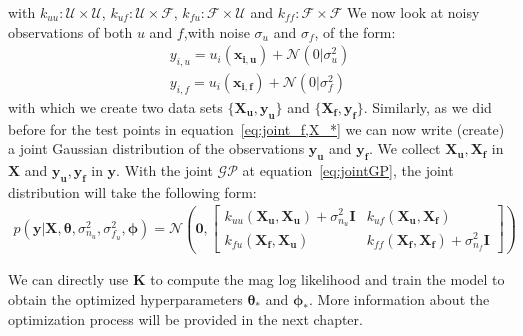 \documentclass{article}
\begin{document}
with $k_{uu}: \mathcal{U} \times  \mathcal{U}$, $k_{uf}: \mathcal{U} \times  \mathcal{F}$, $k_{fu}: \mathcal{F} \times  \mathcal{U}$ and $k_{ff}: \mathcal{F} \times  \mathcal{F}$
We now look at noisy observations of both $u$ and $f$,with noise $\sigma_u$ and $\sigma_f$, of the form:
\begin{equation}
    \begin{aligned}
        y_{i,u} = u_i(\bm{x_{i,u}}) + \mathcal{N}(0|\sigma_u^2) \\
        y_{i,f} = u_i(\bm{x_{i,f}}) + \mathcal{N}(0|\sigma_f^2)
    \end{aligned}
\end{equation}
with which we create two data sets $\{\bm{X_u,y_u}\}$ and $\{\bm{X_f,y_f}\}$. Similarly, as we did before for the test points in equation~\ref{eq:joint_f,X_*} we can now write (create) a joint Gaussian distribution of the observations $\bm{y_u}$ and $\bm{y_f}$. We collect $\bm{X_u,X_f}$ in $\bm{X}$ and $\bm{y_u,y_f}$ in $\bm{y}$. With the joint $\mathcal{GP}$ at equation~\ref{eq:jointGP}, the joint distribution will take the following form:
\begin{equation}
    \label{eq:jointGP_observations}
    \begin{aligned}
        p(\bm{y}|\bm{X},\bm{\theta},\sigma_{n_u}^2,\sigma_{f_u}^2,\bm{\phi}) =
        \mathcal{N}\left(\bm{0},
        \begin{bmatrix}
            k_{uu}(\bm{X_u,X_u}) + \sigma_{n_u}^2 \bm{I} & k_{uf}(\bm{X_u,X_f})                         \\
            k_{fu}(\bm{X_f,X_u})                         & k_{ff}(\bm{X_f,X_f}) + \sigma_{n_f}^2 \bm{I}
        \end{bmatrix}\right)
    \end{aligned}
\end{equation}

We can directly use $\bm{K}$ to compute the mag log likelihood and train the
model to obtain the optimized hyperparameters $\bm{\theta_*}$ and
$\bm{\phi_*}$. More information about the optimization process will be provided
in the next chapter.
\end{document}
